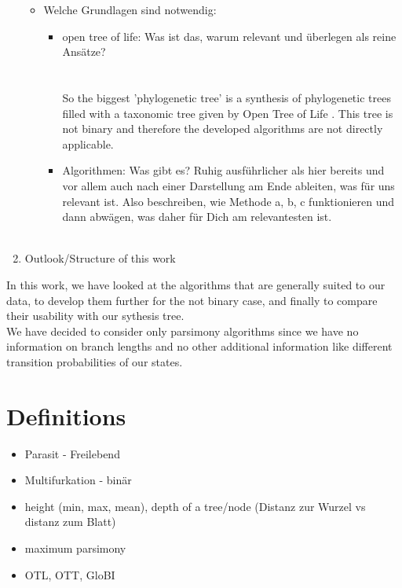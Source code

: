\begin{enumerate}
\begin{itemize}
        \item Welche Grundlagen sind notwendig:
          \begin{itemize}
            \item open tree of life: Was ist das, warum relevant und überlegen als reine Ansätze? \\
              \todo{!!!} \\ \\
  So the biggest 'phylogenetic tree' is a synthesis 
    of phylogenetic trees filled with a taxonomic tree given by Open Tree of Life \cite{Hinchliff2015}.
    This tree is not binary and therefore the developed algorithms are not directly applicable. \\
            \item Algorithmen: Was gibt es? Ruhig ausführlicher als hier bereits und vor allem auch 
              nach einer Darstellung am Ende ableiten, was für uns relevant ist. Also beschreiben, 
              wie Methode a, b, c funktionieren und dann abwägen, was daher für Dich am 
              relevantesten ist. \\
              \todo{!!!} \\
          \end{itemize}
      \end{itemize}
    \item Outlook/Structure of this work
  \end{enumerate}


  In this work, we have looked at the algorithms that are generally suited to our data, to develop 
  them further for the not binary case, and finally to compare their usability with our sythesis 
  tree. \\
  We have decided to consider only parsimony algorithms since we have no information on branch 
  lengths and no other additional information like different transition probabilities of our states.

  \section{Definitions}
    \begin{itemize}
      \item Parasit - Freilebend
      \item Multifurkation - binär
      \item height (min, max, mean), depth of a tree/node (Distanz zur Wurzel vs distanz zum Blatt)
      \item maximum parsimony
      \item OTL, OTT, GloBI
    \end{itemize}

